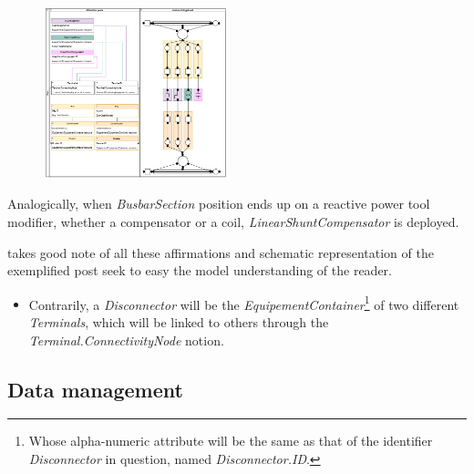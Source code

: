 \begin{figure}[h]
    \centering
    \parbox[t]{0.475\textwidth}{
    {\centering
    \includegraphics[width=0.475\textwidth]{0.figuras/Jointure_VoltageLevels.png}}
    \label{fig:VoltageLevel-interconnections}}
\end{figure}

\begin{itemize}[label={}]
        \begin{itemize}[label={}]
 Analogically, when \textit{BusbarSection} position ends up on a reactive power tool modifier, whether a compensator or a coil, \textit{LinearShuntCompensator} is deployed. 
 
  takes good note of all these affirmations and schematic representation of the exemplified post seek to easy the model understanding of the reader.
\end{itemize}
    \end{itemize}
    

\begin{itemize}[label={}]
\begin{itemize}

\item Contrarily, a \textit{Disconnector} will be the \textit{EquipementContainer}\footnote{Whose alpha-numeric attribute will be the same as that of the identifier \textit{Disconnector} in question, named \textit{Disconnector.ID}.} of two different \textit{Terminals}, which will be linked to others through the \textit{Terminal.ConnectivityNode} notion.

\end{itemize}
    \end{itemize}

\subsection{Data management}
\label{sub:AIG:data-management}

